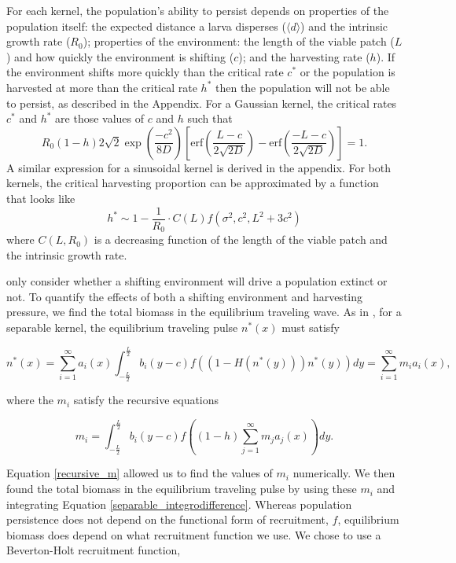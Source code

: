 \documentclass[]{article}
\begin{document}
For each kernel, the population's ability to persist depends on properties of the population itself: the expected distance a larva disperses ($\langle d \rangle$) and the intrinsic growth rate ($R_0$); properties of the environment: the 
length of the viable patch ($L$) and how quickly the environment is shifting ($c$); and the harvesting rate ($h
$). If the environment shifts more quickly than the critical rate $c^*$ or the population is harvested at more than 
the critical rate $h^*$ then the population will not be able to persist, as described in the Appendix.  For a Gaussian kernel, the critical rates $c^*$ and $h^*$ are those values of $c$ and $h$ such that 
$$R_0(1-h)2\sqrt{2}\exp\left(\frac{-c^2}{8D}\right)\left[\text{erf}\left(\frac{L-c}{2\sqrt{2D}}\right)-\text{erf}\left(\frac{-L-c}{2\sqrt{2D}}\right)\right]=1.$$
A similar expression for a sinusoidal kernel is derived in the appendix.  For both kernels, the critical harvesting proportion can be approximated by a function that looks like 
\begin{equation}
h^*\sim1- \frac{1}{R_0}\cdot C(L)f(\sigma^2,c^2,L^2+3c^2)
\end{equation}
where $C(L,R_0)$ is a decreasing function of the length of the viable patch and the intrinsic growth rate.

\citet{ZhouKot2011} only consider whether a shifting environment will drive a population extinct or not.  To quantify the effects of both a shifting environment and harvesting pressure, we find the total biomass in the equilibrium traveling wave. As in \citet{Latore:1998fk}, for a separable kernel, the equilibrium traveling pulse $n^*(x)$ must satisfy

\begin{equation}
n^*(x)=\sum^\infty_{i=1}
a_i(x)\int^{\frac{L}{2}}_{-\frac{L}{2}}b_i(y-c)f((1-H(n^*(y)))n^*(y))dy=\sum^\infty_{i=1}m_ia_i(x), \label{separable_integrodifference}
\end{equation}

\noindent where the $m_i$ satisfy the recursive equations

\begin{equation}
m_i=\int^{\frac{L}{2}}_{-\frac{L}{2}}b_i(y-c)f\left((1-h)\sum^\infty_{j=1}m_ja_j(x)\right)
dy. \label{recursive_m}
\end{equation}

\noindent Equation \ref{recursive_m} allowed us to find the values of $m_i$ numerically. We then found the total biomass in the 
equilibrium traveling pulse by using these $m_i$ and integrating Equation \ref{separable_integrodifference}.  Whereas population persistence does not depend on the functional form of recruitment, $f$, equilibrium biomass does depend on what recruitment function we use.  We chose to use a Beverton-Holt recruitment function,
\end{document}
